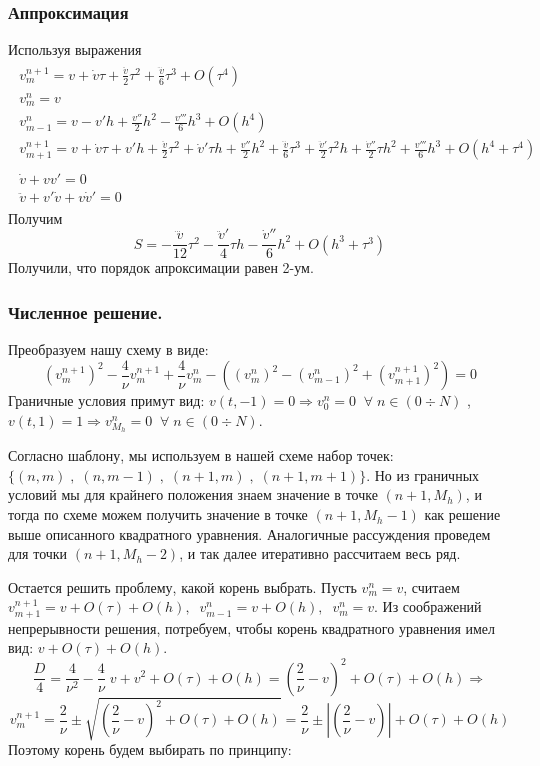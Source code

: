 \documentclass[a4paper,12pt]{article}
\begin{document}
\subsubsection{Аппроксимация}
Используя выражения
\begin{align*}
\begin{array}{l}
    v_m^{n+1}=v+\dot v \tau+\frac{\ddot v}{2} {\tau}^2+\frac{\dddot v}6{\tau}^3+O({\tau}^4)\\
    v_m^n=v\\
    v^n_{m-1}=v-v' h+\frac{v''}2 h^2-\frac{v'''}6 h^3 +O(h^4)\\
    v^{n+1}_{m+1}=v+\dot v \tau +v' h +\frac{\ddot v}{2} \tau^2 + \dot v' \tau h + \frac{v''}{2} h^2 + \frac{\dddot v}{6} \tau^3 + \frac{\ddot v'}{2} \tau^2 h +\frac{\dot v''}{2}\tau h^2+\frac{v'''}{6} h^3+ O(h^4+\tau^4)   \\
    \\
    \dot v +vv'=0\\
    \ddot v +v'\dot v+v\dot v'=0
\end{array}
\end{align*}
Получим 
\[
 S=-\frac{\dddot v}{12}\tau^2-\frac{\ddot v'}{4}\tau h -\frac{\dot v''}{6} h^2 +O(h^3+ \tau^3)
\]
Получили, что порядок апроксимации равен 2-ум.

\subsubsection{Численное решение.}
Преобразуем нашу схему в виде:
\[
    (v_m^{n+1})^2-\frac{4}{\nu}v^{n+1}_m+\frac{4}{\nu}v_m^n-((v_m^n)^2-(v^n_{m-1})^2+(v^{n+1}_{m+1})^2)=0
\]
Граничные условия примут вид: $v(t,-1)=0 \Rightarrow v^n_0=0 \;\; \forall\; n \in (0 \div N)$ , $v(t,1)=1 \Rightarrow v^n_{M_h}=0 \;\; \forall\; n \in (0 \div N)$.

Согласно шаблону, мы используем в нашей схеме набор точек: $\{(n,m)\; ,\; (n,m-1)\; , \; (n+1,m) \; , \; (n+1,m+1)\}$. Но из граничных условий мы для крайнего положения знаем значение в точке $(n+1,M_h)$, и тогда по схеме можем получить значение в точке $(n+1,M_h-1)$ как решение выше описанного квадратного уравнения. Аналогичные рассуждения проведем для точки $(n+1,M_h-2)$, и так далее итеративно рассчитаем весь ряд.

Остается решить проблему, какой корень выбрать. Пусть $v^n_m=v$, считаем $v_{m+1}^{n+1}=v + O(\tau) + O(h),\;\;v^n_{m-1}=v+O(h),\;\; v^n_m=v$. Из соображений непрерывности решения, потребуем, чтобы корень квадратного уравнения имел вид: $v+O(\tau)+O(h)$.
\[
    \frac{D}4=\frac{4}{\nu^2}-\frac{4}{\nu}\; v+v^2+O(\tau)+O(h)=\left(\frac2\nu -v\right)^2+O(\tau)+O(h) \Rightarrow
\]
\[
    v^{n+1}_m=\frac{2}{\nu}\pm\sqrt{\left(\frac2\nu -v\right)^2+O(\tau)+O(h)}=\frac{2}{\nu} \pm \left|\left(\frac2\nu -v\right)\right|+O(\tau)+O(h)
\]
Поэтому корень будем выбирать по принципу:
\end{document}
